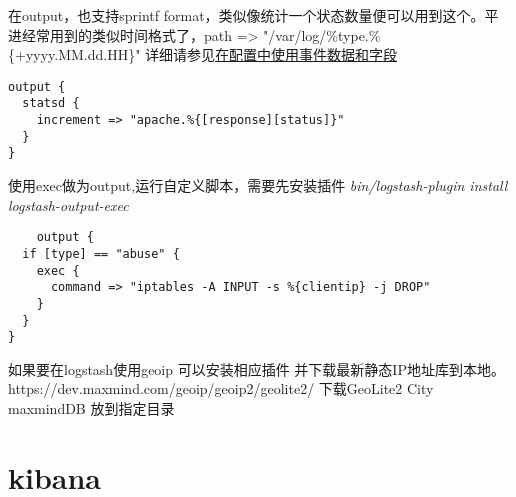 在output，也支持sprintf format，类似像统计一个状态数量便可以用到这个。平进经常用到的类似时间格式了，path => "/var/log/\%{type}.\%\{+yyyy.MM.dd.HH\}" 详细请参见\href{https://www.elastic.co/guide/en/logstash/current/event-dependent-configuration.html}{在配置中使用事件数据和字段}
\begin{lstlisting}
output {
  statsd {
    increment => "apache.%{[response][status]}"
  }
}
\end{lstlisting}

使用exec做为output,运行自定义脚本，需要先安装插件 \textit{ bin/logstash-plugin install logstash-output-exec}

\begin{lstlisting}
	output {
  if [type] == "abuse" {
    exec {
      command => "iptables -A INPUT -s %{clientip} -j DROP"
    }
  }
}
\end{lstlisting}

如果要在logstash使用geoip 可以安装相应插件  并下载最新静态IP地址库到本地。https://dev.maxmind.com/geoip/geoip2/geolite2/  下载GeoLite2 City maxmindDB 放到指定目录

\section{kibana}


